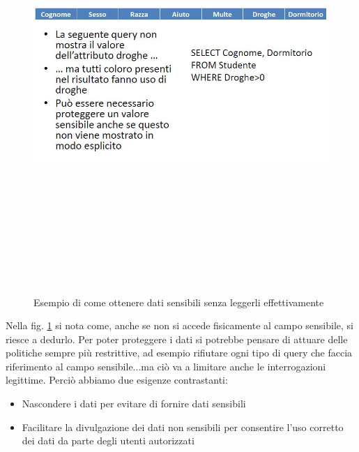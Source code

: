 \begin{figure}[htbp]

	\centering

		{\includegraphics[height=15cm, width=12cm, keepaspectratio]{Immagini/Appendice1/prot_dati_02.JPG}}
			\caption{Esempio di come ottenere dati sensibili senza leggerli effettivamente \label{fig:query_db}}
\end{figure}

Nella fig. \ref{fig:query_db} si nota come, anche se non si accede fisicamente al campo sensibile, si riesce a dedurlo.
Per poter proteggere i dati si potrebbe pensare di attuare delle politiche sempre più restrittive, ad esempio rifiutare ogni tipo di query che faccia riferimento al campo sensibile...ma ciò va a limitare anche le interrogazioni legittime.
Perciò abbiamo due esigenze contrastanti:
\begin{itemize}

	\item Nascondere i dati per evitare di fornire dati sensibili
	\item Facilitare la divulgazione dei dati non sensibili per consentire l'uso corretto dei dati da parte degli utenti autorizzati
	
\end{itemize}

